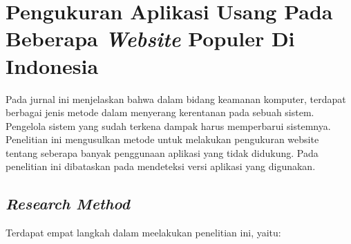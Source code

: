 \section{Pengukuran Aplikasi Usang Pada Beberapa \textit{Website} Populer Di Indonesia\cite{pascal}}

Pada jurnal ini menjelaskan bahwa dalam bidang keamanan komputer, terdapat berbagai jenis metode dalam menyerang kerentanan pada sebuah sistem. Pengelola sistem yang sudah terkena dampak harus memperbarui sistemnya. Penelitian ini mengusulkan metode untuk melakukan pengukuran website tentang seberapa banyak penggunaan aplikasi yang tidak didukung. Pada penelitian ini dibataskan pada mendeteksi versi aplikasi yang digunakan.

\subsection{\textit{Research Method}}
Terdapat empat langkah dalam meelakukan penelitian ini, yaitu:

